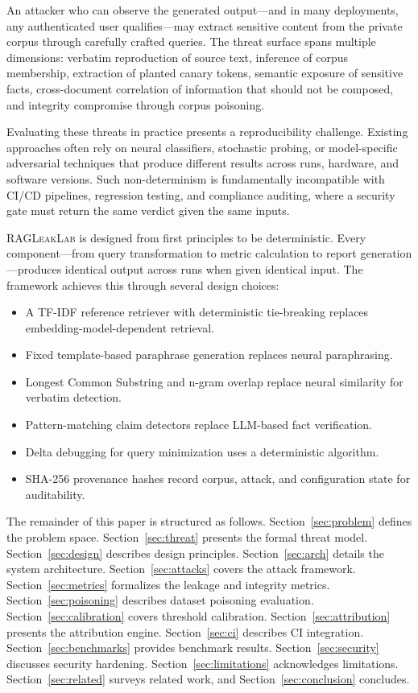 \documentclass[11pt,a4paper]{article}
\begin{document}
An attacker who can observe the generated output---and in many deployments, any
authenticated user qualifies---may extract sensitive content from the private
corpus through carefully crafted queries. The threat surface spans multiple
dimensions: verbatim reproduction of source text, inference of corpus membership,
extraction of planted canary tokens, semantic exposure of sensitive facts,
cross-document correlation of information that should not be composed, and
integrity compromise through corpus poisoning.

Evaluating these threats in practice presents a reproducibility challenge.
Existing approaches often rely on neural classifiers, stochastic probing, or
model-specific adversarial techniques that produce different results across
runs, hardware, and software versions. Such non-determinism is fundamentally
incompatible with CI/CD pipelines, regression testing, and compliance
auditing, where a security gate must return the same verdict given the same
inputs.

\textsc{RAGLeakLab} is designed from first principles to be deterministic.
Every component---from query transformation to metric calculation to report
generation---produces identical output across runs when given identical input.
The framework achieves this through several design choices:

\begin{itemize}[nosep]
  \item A TF-IDF reference retriever with deterministic tie-breaking replaces
        embedding-model-dependent retrieval.
  \item Fixed template-based paraphrase generation replaces neural paraphrasing.
  \item Longest Common Substring and n-gram overlap replace neural similarity
        for verbatim detection.
  \item Pattern-matching claim detectors replace LLM-based fact verification.
  \item Delta debugging for query minimization uses a deterministic algorithm.
  \item SHA-256 provenance hashes record corpus, attack, and configuration
        state for auditability.
\end{itemize}

The remainder of this paper is structured as follows. Section~\ref{sec:problem}
defines the problem space. Section~\ref{sec:threat} presents the formal threat
model. Section~\ref{sec:design} describes design principles.
Section~\ref{sec:arch} details the system architecture.
Section~\ref{sec:attacks} covers the attack framework.
Section~\ref{sec:metrics} formalizes the leakage and integrity metrics.
Section~\ref{sec:poisoning} describes dataset poisoning evaluation.
Section~\ref{sec:calibration} covers threshold calibration.
Section~\ref{sec:attribution} presents the attribution engine.
Section~\ref{sec:ci} describes CI integration.
Section~\ref{sec:benchmarks} provides benchmark results.
Section~\ref{sec:security} discusses security hardening.
Section~\ref{sec:limitations} acknowledges limitations.
Section~\ref{sec:related} surveys related work, and
Section~\ref{sec:conclusion} concludes.
\end{document}
